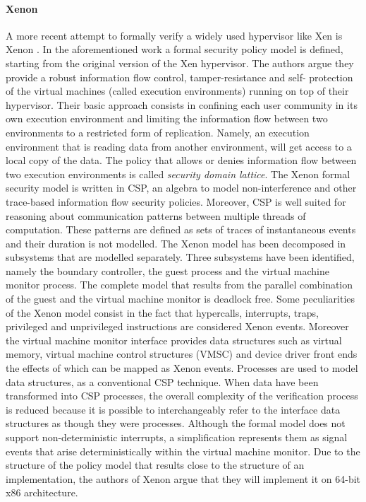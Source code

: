 \paragraph{Xenon}
A more recent attempt to formally verify a widely used hypervisor like Xen \cite{xen} is Xenon \cite{xenon}. In the aforementioned work a formal security policy model is defined, starting from the original version of the Xen hypervisor. The authors argue they provide a robust information flow control, tamper-resistance and self- protection of the virtual machines (called execution environments) running on top of their hypervisor. 
Their basic approach consists in confining each user community in its own execution environment and limiting the information flow between two environments to a restricted form of replication. Namely, an execution environment that is reading data from another environment, will get access to a local copy of the data.
The policy that allows or denies information flow between two execution environments is called \emph{security domain lattice}. 
The Xenon formal security model is written in CSP, an algebra to model non-interference and other trace-based information flow security policies. Moreover, CSP is well suited for reasoning about communication patterns between multiple threads of computation. These patterns are defined as sets of traces of instantaneous events and their duration is not modelled. 
The Xenon model has been decomposed in subsystems that are modelled separately. Three subsystems have been identified, namely the boundary controller, the guest process and the virtual machine monitor process. The complete model that results from the parallel combination of the guest and the virtual machine monitor is deadlock free.
Some peculiarities of the Xenon model consist in the fact that hypercalls, interrupts, traps, privileged and unprivileged instructions are considered Xenon events. Moreover the virtual machine monitor interface provides data structures such as virtual memory, virtual machine control structures (VMSC) and device driver front ends the effects of which can be mapped as Xenon events.
Processes are used to model data structures, as a conventional CSP technique. When data have been transformed into CSP processes, the overall complexity of the verification process is reduced because it is possible to interchangeably refer to the interface data structures as though they were processes.
Although the formal model does not support non-deterministic interrupts, a simplification represents them as signal events that arise deterministically within the virtual machine monitor. 
Due to the structure of the policy model that results close to the structure of an implementation, the authors of Xenon argue that they will implement it on 64-bit x86 architecture.



